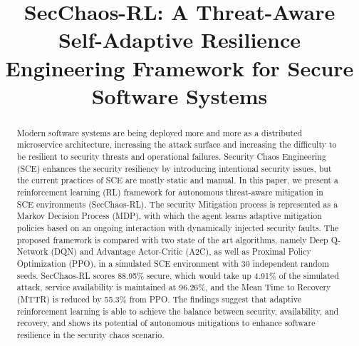 \documentclass[conference,10pt]{IEEEtran}
\begin{document}
	
	\title{SecChaos-RL: A Threat-Aware Self-Adaptive Resilience Engineering Framework for Secure Software Systems}
\author{
	\and
}


	\maketitle
	
	\begin{abstract}
Modern software systems are being deployed more and more as a distributed microservice architecture, increasing the attack surface and increasing the difficulty to be resilient to security threats and operational failures. Security Chaos Engineering (SCE) enhances the security resiliency by introducing intentional security issues, but the current practices of SCE are mostly static and manual. In this paper, we present a reinforcement learning (RL) framework for autonomous threat-aware mitigation in SCE environments (SecChaos-RL). The security Mitigation process is represented as a Markov Decision Process (MDP), with which the agent learns adaptive mitigation policies based on an ongoing interaction with dynamically injected security faults. The proposed framework is compared with two state of the art algorithms, namely Deep Q-Network (DQN) and Advantage Actor-Critic (A2C), as well as Proximal Policy Optimization (PPO), in a simulated SCE environment with 30 independent random seeds. SecChaos-RL scores 88.95\% secure, which would take up 4.91\% of the simulated attack, service availability is maintained at 96.26\%, and the Mean Time to Recovery (MTTR) is reduced by 55.3\% from PPO. The findings suggest that adaptive reinforcement learning is able to achieve the balance between security, availability, and recovery, and shows its potential of autonomous mitigations to enhance software resilience in the security chaos scenario.

	\end{abstract}
	
\end{document}
